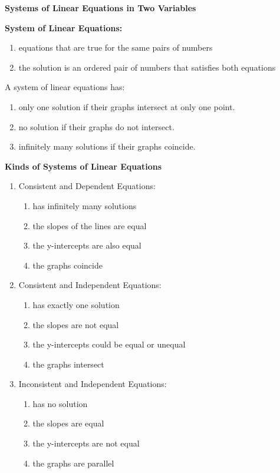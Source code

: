 \begin{center}
\textbf{Systems of Linear Equations in Two Variables}
\end{center}

\vspace*{1ex}

\textbf{System of  Linear Equations:}
\begin{enumerate}[label = \alph*. ]
\item equations that are true for the same pairs of numbers
\item the solution is an ordered pair of numbers that satisfies both equations 
\end{enumerate} 

\vspce 

A system of linear equations has: 
\begin{enumerate}[label = \alph*. ]
\item only one solution if their graphs intersect at only one point.
\item no solution if their graphs do not intersect. 
\item infinitely many solutions if their graphs coincide.  
\end{enumerate} 

\vspce 

\textbf{Kinds of Systems of Linear Equations}
\begin{enumerate}[label = \arabic*. ]
\item Consistent and Dependent Equations:
\begin{enumerate}[label = \alph*. ]
\item has infinitely many solutions
\item the slopes of the lines are equal
\item the y-intercepts are also equal
\item the graphs coincide  
\end{enumerate} 
   
\item Consistent and Independent Equations: 
\begin{enumerate}[label = \alph*. ]
\item has exactly one solution
\item the slopes are not equal
\item the y-intercepts could be equal or unequal
\item the graphs intersect  
\end{enumerate} 

\item Inconsistent and Independent Equations: 
\begin{enumerate}[label = \alph*. ]
\item has no solution
\item the slopes are equal 
\item the y-intercepts are not equal
\item the graphs are parallel  
\end{enumerate} 
\end{enumerate} 

